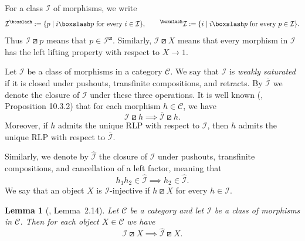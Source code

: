 \documentclass{article}
\theoremstyle{plain}
\newtheorem{lemma}[theorem]{Lemma}
\theoremstyle{definition}
\theoremstyle{remark}
\begin{document}
For a class $\mathcal I$ of morphisms, we write
\[
    \mathcal I^{\boxslash}
    :=\{p\mid i\boxslash p \text{ for every }i\in\mathcal I\},
    \qquad
    \prescript{\boxslash}{}{\mathcal I}
    :=\{i\mid i\boxslash p \text{ for every }p\in\mathcal I\}.
\]
Thus $\mathcal I\boxslash p$ means that
$p\in\mathcal I^{\boxslash}$. Similarly,
$\mathcal I\boxslash X$ means that every morphism in $\mathcal I$
has the left lifting property with respect to $X\to1$.

Let $\mathcal{I}$ be a class of morphisms in a category $\mathcal{C}$. We say that $\mathcal{I}$ is \emph{weakly saturated} if it is closed under pushouts, transfinite compositions, and retracts.
By $\overline{\mathcal{I}}$ we denote the closure of $\mathcal{I}$ under these three operations. It is well known (\cite{H2003}, Proposition 10.3.2) that for each morphism $h\in\mathcal{C}$, we have
\[
\mathcal{I}\boxslash h \implies \overline{\mathcal{I}}\boxslash h .
\]
Moreover, if $h$ admits the unique RLP with respect to $\mathcal{I}$, then $h$ admits the unique RLP with respect to $\overline{\mathcal{I}}$.

Similarly, we denote by $\widehat{\mathcal{I}}$ the closure of $\mathcal{I}$ under pushouts, transfinite compositions, and cancellation of a left factor, meaning that
\[
h_1h_2\in\widehat{\mathcal{I}}
\implies
h_2\in\widehat{\mathcal{I}}.
\]
We say that an object $X$ is $\mathcal{I}$-injective if $h\boxslash X$ for every $h\in\mathcal{I}$.

\begin{lemma}[\cite{AHS2007}, Lemma~2.14]\label{lem:fibHelp}
Let $\mathcal{C}$ be a category and let $\mathcal{I}$ be a class of morphisms in $\mathcal{C}$. Then for each object $X\in\mathcal{C}$ we have
\[
\mathcal{I}\boxslash X \implies \widehat{\mathcal{I}}\boxslash X .
\]
\end{lemma}
\end{document}
